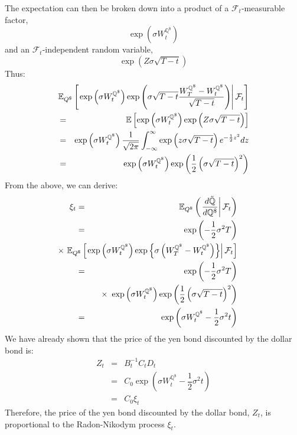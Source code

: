 \documentclass[uplatex,a4j,12pt,dvipdfmx]{jsarticle}
\begin{document}
The expectation can then be broken down into a product of a $\mathcal{F}_{t}$-measurable factor,
$$
	\exp
	\left(
	\sigma W^{\mathbb{Q}^{\$}}_{t}
	\right)
$$
and an $\mathcal{F}_{t}$-independent random variable,
$$
	\exp
	\left(
	Z \sigma \sqrt{T-t}
	\right)
$$
Thus:
%
%
\begin{eqnarray*}
	&&
	\hspace{-10mm}
	\mathbb{E}_{Q^{\$}}
	\left[
		\left.
		\exp
		\left(
		\sigma W^{\mathbb{Q}^{\$}}_{t}
		\right)
		\exp
		\left(
		\sigma
		\sqrt{T-t}
		\dfrac{
			W^{\mathbb{Q}^{\$}}_{T} - W^{\mathbb{Q}^{\$}}_{t}
		}
		{
			\sqrt{T-t}
		}
		\right)
		\right|
		\mathcal{F}_{t}
		\right]
	\\ &=&
	\mathbb{E}
	\left[
		\exp
		\left(
		\sigma W^{\mathbb{Q}^{\$}}_{t}
		\right)
		\exp
		\left(
		Z \sigma \sqrt{T-t}
		\right)
		\right]
	\\ &=&
	\exp
	\left(
	\sigma W^{\mathbb{Q}^{\$}}_{t}
	\right)
	\dfrac{1}{\sqrt{2 \pi}}
	\int^{\infty}_{- \infty}
	\exp
	\left(
	z \sigma \sqrt{T-t}
	\right)
	e^{- \frac{1}{2} z^{2}}
	dz
	\\ &=&
	\exp
	\left(
	\sigma W^{\mathbb{Q}^{\$}}_{t}
	\right)
	\exp
	\left(
	\dfrac{1}{2} \left( \sigma \sqrt{T-t} \right)^{2}
	\right)
\end{eqnarray*}
%
%
From the above, we can derive:
%
%
\begin{eqnarray*}
	\xi_{t}
	&=&
	\mathbb{E}_{Q^{\$}}
	\left(
	\left.
	\dfrac{d \tilde{\mathbb{Q}}}{d \mathbb{Q}^{\$}}
	\right|
	\mathcal{F}_{t}
	\right)
	\\ &=&
	\exp
	\left(
	- \dfrac{1}{2} \sigma^{2} T
	\right)
	\\ && \hspace{-15mm} \times \
	\mathbb{E}_{Q^{\$}}
	\left[
		\left.
		\exp
		\left(
		\sigma W^{\mathbb{Q}^{\$}}_{t}
		\right)
		\exp
		\left\{
		\sigma
		\left(
		W^{\mathbb{Q}^{\$}}_{T} - W^{\mathbb{Q}^{\$}}_{t}
		\right)
		\right\}
		\right|
		\mathcal{F}_{t}
		\right]
	\\ &=&
	\exp
	\left(
	- \dfrac{1}{2} \sigma^{2} T
	\right)
	\\ && \hspace{-15mm} \times \
	\exp
	\left(
	\sigma W^{\mathbb{Q}^{\$}}_{t}
	\right)
	\exp
	\left(
	\dfrac{1}{2} \left( \sigma \sqrt{T-t} \right)^{2}
	\right)
	\\ &=&
	\exp
	\left(
	\sigma W^{\mathbb{Q}^{\$}}_{t} - \dfrac{1}{2} \sigma^{2} t
	\right)
\end{eqnarray*}
%
%
We have already shown that the price of the yen bond discounted by the dollar bond is:
%
%
\begin{eqnarray*}
	Z_{t}
	&=&
	B^{-1}_{t}
	C_{t}
	D_{t}
	\\ &=&
	C_{0}
	\exp
	\left(
	\sigma W^{\mathbb{Q}^{\$}}_{t} - \dfrac{1}{2} \sigma^{2} t
	\right)
	\\ &=&
	C_{0} \xi_{t}
\end{eqnarray*}
%
%
Therefore, the price of the yen bond discounted by the dollar bond, $Z_{t}$, is proportional to the Radon-Nikodym process $\xi_{t}$.
\end{document}
